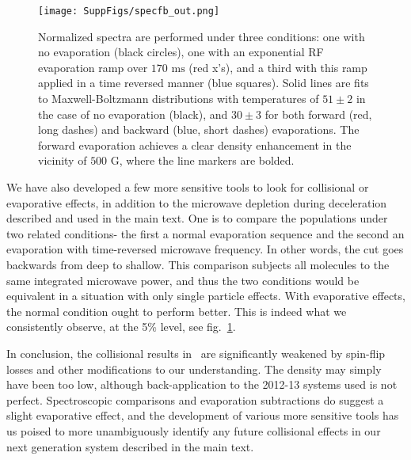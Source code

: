 \documentclass[%
 reprint,
 amsmath,amssymb,
 aps,
prl,
]{revtex4-1}
\begin{document}
\begin{figure}[tb]
\texttt{[image: SuppFigs/specfb\_out.png]}%
\caption{
Normalized spectra are performed under three conditions: one with no evaporation (black circles), one with an exponential RF evaporation ramp over $170\text{ ms}$ (red x's), and a third with this ramp applied in a time reversed manner (blue squares). Solid lines are fits to Maxwell-Boltzmann distributions with temperatures of $51\pm2$ in the case of no evaporation (black), and $30\pm3$ for both forward (red, long dashes) and backward (blue, short dashes) evaporations. The forward evaporation achieves a clear density enhancement in the vicinity of $500\text{ G}$, where the line markers are bolded. 
}
\label{fig:normenhance}
\end{figure}

We have also developed a few more sensitive tools to look for collisional or evaporative effects, in addition to the microwave depletion during deceleration described and used in the main text.
One is to compare the populations under two related conditions- the first a normal evaporation sequence and the second an evaporation with time-reversed microwave frequency. 
In other words, the cut goes backwards from deep to shallow. 
This comparison subjects all molecules to the same integrated microwave power, and thus the two conditions would be equivalent in a situation with only single particle effects. 
With evaporative effects, the normal condition ought to perform better. 
This is indeed what we consistently observe, at the 5\% level, see fig.~\ref{fig:normenhance}.


In conclusion, the collisional results in~\cite{Stuhl2012evap,Stuhl2013} are significantly weakened by spin-flip losses and other modifications to our understanding. The density may simply have been too low, although back-application to the 2012-13 systems used is not perfect. Spectroscopic comparisons and evaporation subtractions do suggest a slight evaporative effect, and the development of various more sensitive tools has us poised to more unambiguously identify any future collisional effects in our next generation system described in the main text.



\end{document}

